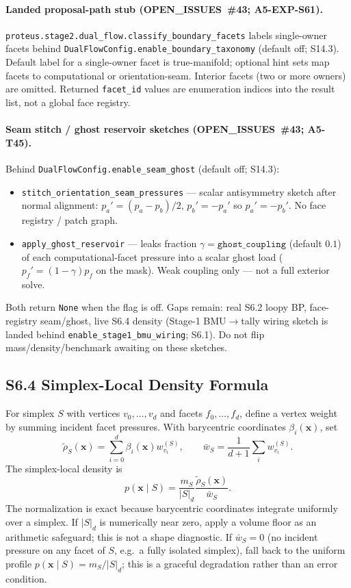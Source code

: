 \documentclass[11pt]{article}
\begin{document}
\paragraph{Landed proposal-path stub (OPEN\_ISSUES~\#43; A5-EXP-S61).}
\texttt{proteus.stage2.dual\_flow.classify\_boundary\_facets} labels single-owner
facets behind \texttt{DualFlowConfig.enable\_boundary\_taxonomy} (default off;
S14.3). Default label for a single-owner facet is true-manifold; optional
hint sets map facets to computational or orientation-seam. Interior facets
(two or more owners) are omitted. Returned \texttt{facet\_id} values are
enumeration indices into the result list, not a global face registry.

\paragraph{Seam stitch / ghost reservoir sketches (OPEN\_ISSUES~\#43; A5-T45).}
Behind \texttt{DualFlowConfig.enable\_seam\_ghost} (default off; S14.3):
\begin{itemize}[leftmargin=1.5em]
  \item \texttt{stitch\_orientation\_seam\_pressures} --- scalar antisymmetry
  sketch after normal alignment: $p_a'=(p_a-p_b)/2$, $p_b'=-p_a'$ so
  $p_a'=-p_b'$. No face registry / patch graph.
  \item \texttt{apply\_ghost\_reservoir} --- leaks fraction
  $\gamma{=}\texttt{ghost\_coupling}$ (default $0.1$) of each
  computational-facet pressure into a scalar ghost load
  ($p_f'=(1-\gamma)p_f$ on the mask). Weak coupling only --- not a full
  exterior solve.
\end{itemize}
Both return \texttt{None} when the flag is off. Gaps remain: real S6.2 loopy
BP, face-registry seam/ghost, live S6.4 density (Stage-1 BMU$\to$tally
wiring sketch is landed behind \texttt{enable\_stage1\_bmu\_wiring}; S6.1). Do
not flip mass/density/benchmark awaiting on these sketches.

\subsection*{S6.4 Simplex-Local Density Formula}
\label{sec:si-simplex-density}
For simplex $S$ with vertices $v_0,\dots,v_d$ and facets $f_0,\dots,f_d$, define a vertex weight by summing incident facet pressures. With barycentric coordinates $\beta_i(\mathbf x)$, set
\[
\widetilde\rho_S(\mathbf x)=\sum_{i=0}^d\beta_i(\mathbf x)w_{v_i}^{(S)},\qquad
\bar w_S=\frac{1}{d+1}\sum_iw_{v_i}^{(S)}.
\]
The simplex-local density is
\[
p(\mathbf x\mid S)=
\frac{m_S}{|S|_d}
\frac{\widetilde\rho_S(\mathbf x)}{\bar w_S}.
\label{eq:si-simplex-local-density}
\]
The normalization is exact because barycentric coordinates integrate uniformly over a simplex. If $|S|_d$ is numerically near zero, apply a volume floor as an arithmetic safeguard; this is not a shape diagnostic. If $\bar w_S=0$ (no incident pressure on any facet of $S$, e.g.\ a fully isolated simplex), fall back to the uniform profile $p(\mathbf x\mid S)=m_S/|S|_d$; this is a graceful degradation rather than an error condition.
\end{document}
